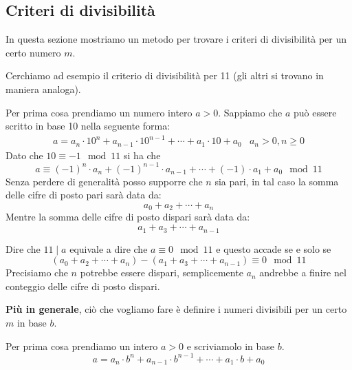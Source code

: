 \subsection{Criteri di divisibilit\`a}
In questa sezione mostriamo un metodo per trovare i criteri di divisibilit\`a per un certo
numero $m$.

\begin{example}
	Cerchiamo ad esempio il criterio di divisibilit\`a per 11 (gli altri si trovano in maniera
	analoga).

	Per prima cosa prendiamo un numero intero $a > 0$. Sappiamo che $a$ pu\`o essere scritto
	in base 10 nella seguente forma:
	\begin{equation*}
		\begin{array}{lr}
			a = a_n \cdot 10^n + a_{n-1} \cdot 10^{n - 1} + \cdots + a_1 \cdot 10 + a_0
			 & a_n > 0, n \geq 0
		\end{array}
	\end{equation*}
	Dato che $10 \equiv -1 \mod{11}$ si ha che
	\begin{equation*}
		a \equiv (-1)^n \cdot a_n  + (-1)^{n-1} \cdot a_{n-1} + \cdots + (-1) \cdot a_1 + a_0
		\mod{11}
	\end{equation*}
	Senza perdere di generalit\`a posso supporre che $n$ sia pari, in tal caso la somma delle
	cifre di posto pari sar\`a data da:
	\begin{equation*}
		a_0 + a_2 + \cdots + a_n
	\end{equation*}
	Mentre la somma delle cifre di posto dispari sar\`a data da:
	\begin{equation*}
		a_1 + a_3 + \cdots + a_{n-1}
	\end{equation*}

	Dire che $11 \mid a$ equivale a dire che $a \equiv 0 \mod{11}$ e questo accade se e solo se
	\begin{equation*}
		(a_0 + a_2 + \cdots + a_n) - (a_1 + a_3 + \cdots + a_{n-1}) \equiv 0 \mod{11}
	\end{equation*}
	Precisiamo che $n$ potrebbe essere dispari, semplicemente $a_n$ andrebbe a finire nel
	conteggio delle cifre di posto dispari.
\end{example}

\textbf{Pi\`u in generale}, ci\`o che vogliamo fare \`e definire i numeri divisibili per un
certo $m$ in base $b$.

Per prima cosa prendiamo un intero $a > 0$ e scriviamolo in base $b$.
\begin{equation*}
	a = a_n \cdot b^n + a_{n-1} \cdot b^{n-1} + \cdots + a_1 \cdot b + a_0
\end{equation*}

